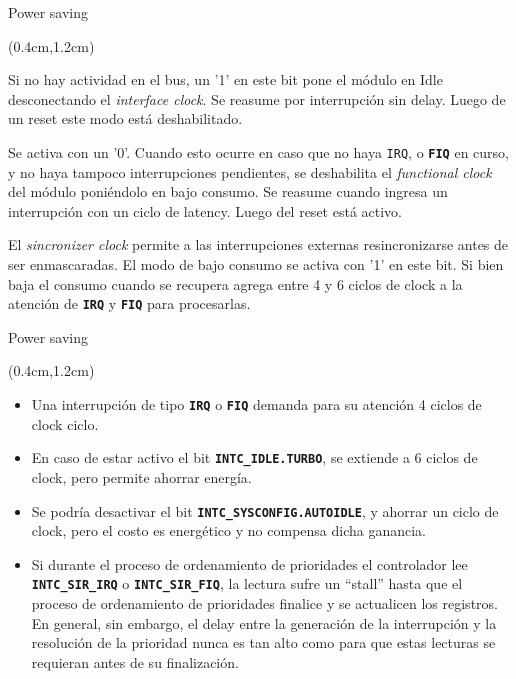 \documentclass[usenames,table,xcolor={x11names},aspectratio=169]{beamer}
\begin{document}
\begin{frame}[t]{Power saving}
 \begin{textblock*}{\textwidth}(0.4cm,1.2cm)
  \begin{description}[<+(1)->]\justifying \parskip 0.18cm
   \item[\textbf{\texttt{INTC\_SYSCONFIG.AUTOIDLE}}] Si no hay actividad en el bus, un '1' en este bit pone el módulo en Idle desconectando el \textit{interface clock}. Se reasume por interrupción sin delay. Luego de un reset este modo está deshabilitado.
   \item[\textbf{\texttt{INTC\_IDLE.FUNCIDLE}}] Se activa con un '0'. Cuando esto ocurre en caso que no haya {\texttt{IRQ}}, o \textbf{\texttt{FIQ}} en curso, y no haya tampoco interrupciones pendientes, se deshabilita el \textit{functional clock} del módulo poniéndolo en bajo consumo. Se reasume cuando ingresa un interrupción con un ciclo de latency. Luego del reset está activo. 
   \item[\textbf{\texttt{INTC\_IDLE.TURBO}}] El \textit{sincronizer clock} permite a las interrupciones externas resincronizarse antes de ser enmascaradas. El modo de bajo consumo se activa con '1' en este bit. Si bien baja el consumo cuando se recupera agrega entre 4 y 6 ciclos de clock a la atención de \texttt{\textbf{IRQ}} y \textbf{\texttt{FIQ}}  para procesarlas.
  \end{description}
 \end{textblock*}
\end{frame}

\begin{frame}[t]{Power saving}
 \begin{textblock*}{\textwidth}(0.4cm,1.2cm)
  \begin{itemize}[<+(1)->]\justifying \parskip 0.18cm
   \item Una interrupción de tipo \texttt{\textbf{IRQ}} o \texttt{\textbf{FIQ}} demanda para su atención 4 ciclos de clock  ciclo.
   \item En caso de estar activo el bit \textbf{\texttt{INTC\_IDLE.TURBO}}, se extiende a 6 ciclos de clock, pero permite ahorrar energía.
   \item Se podría desactivar el bit \textbf{\texttt{INTC\_SYSCONFIG.AUTOIDLE}}, y ahorrar un ciclo de clock, pero el costo es energético y no compensa dicha ganancia.
   \item Si durante el proceso de ordenamiento de prioridades el controlador lee \texttt{\textbf{INTC\_SIR\_IRQ}} o \textbf{\texttt{INTC\_SIR\_FIQ}}, la lectura sufre un ``stall'' hasta que el proceso de ordenamiento de prioridades finalice y se actualicen los registros. En general, sin embargo, el delay entre la generación de la interrupción y la resolución de la prioridad nunca es tan alto como para que estas lecturas se requieran antes de su finalización.
  \end{itemize}
 \end{textblock*}
\end{frame}
\end{document}
